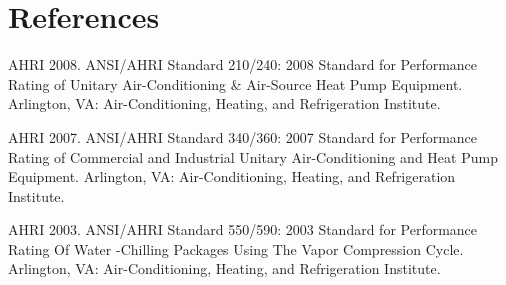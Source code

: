 \section{References}\label{references-001}

AHRI 2008. ANSI/AHRI Standard 210/240: 2008 Standard for Performance Rating of Unitary Air-Conditioning \& Air-Source Heat Pump Equipment. Arlington, VA: Air-Conditioning, Heating, and Refrigeration Institute.

AHRI 2007. ANSI/AHRI Standard 340/360: 2007 Standard for Performance Rating of Commercial and Industrial Unitary Air-Conditioning and Heat Pump Equipment. Arlington, VA: Air-Conditioning, Heating, and Refrigeration Institute.

AHRI 2003. ANSI/AHRI Standard 550/590: 2003 Standard for Performance Rating Of Water -Chilling Packages Using The Vapor Compression Cycle. Arlington, VA: Air-Conditioning, Heating, and Refrigeration Institute.
